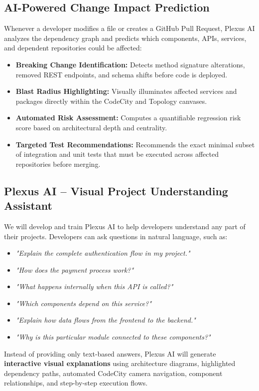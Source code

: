 \documentclass[11pt,a4paper,openany]{report}
\begin{document}
\subsection{AI-Powered Change Impact Prediction}
Whenever a developer modifies a file or creates a GitHub Pull Request, Plexus AI analyzes the dependency graph and predicts which components, APIs, services, and dependent repositories could be affected:
\begin{itemize}[leftmargin=1.2cm]
    \item \textbf{Breaking Change Identification:} Detects method signature alterations, removed REST endpoints, and schema shifts before code is deployed.
    \item \textbf{Blast Radius Highlighting:} Visually illuminates affected services and packages directly within the CodeCity and Topology canvases.
    \item \textbf{Automated Risk Assessment:} Computes a quantifiable regression risk score based on architectural depth and centrality.
    \item \textbf{Targeted Test Recommendations:} Recommends the exact minimal subset of integration and unit tests that must be executed across affected repositories before merging.
\end{itemize}

\subsection{Plexus AI -- Visual Project Understanding Assistant}
We will develop and train Plexus AI to help developers understand any part of their projects. Developers can ask questions in natural language, such as:
\begin{itemize}[leftmargin=1.2cm]
    \item \textit{"Explain the complete authentication flow in my project."}
    \item \textit{"How does the payment process work?"}
    \item \textit{"What happens internally when this API is called?"}
    \item \textit{"Which components depend on this service?"}
    \item \textit{"Explain how data flows from the frontend to the backend."}
    \item \textit{"Why is this particular module connected to these components?"}
\end{itemize}

Instead of providing only text-based answers, Plexus AI will generate \textbf{interactive visual explanations} using architecture diagrams, highlighted dependency paths, automated CodeCity camera navigation, component relationships, and step-by-step execution flows.
\end{document}
